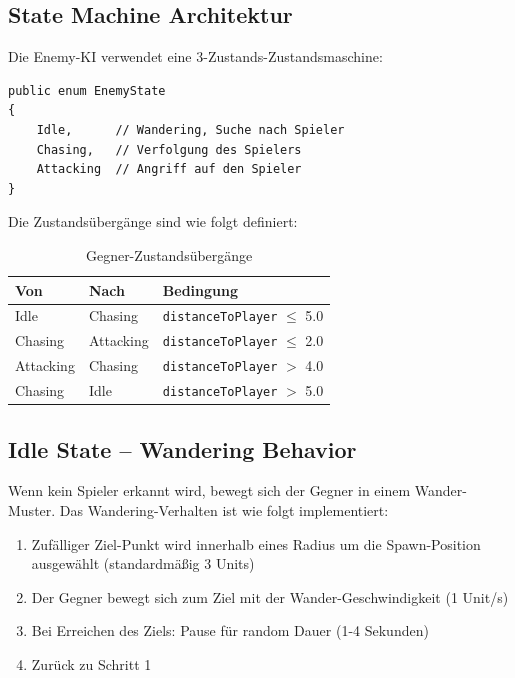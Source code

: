 \documentclass[
  a4paper,
  11pt,
  ngerman,
  parskip=half,
  bibliography=totoc,
  listof=totoc
]{scrreprt}
\begin{document}
\subsection{State Machine Architektur}

Die Enemy-KI verwendet eine 3-Zustands-Zustandsmaschine:

\begin{lstlisting}[caption={Enemy State Machine Enum}, label=lst:enemy_state]
public enum EnemyState
{
    Idle,      // Wandering, Suche nach Spieler
    Chasing,   // Verfolgung des Spielers
    Attacking  // Angriff auf den Spieler
}
\end{lstlisting}

Die Zustandsübergänge sind wie folgt definiert:

\begin{table}[h]
\centering
\caption{Gegner-Zustandsübergänge}
\label{tab:state_transitions}
\begin{tabular}{|l|l|l|}
\hline
\textbf{Von} & \textbf{Nach} & \textbf{Bedingung} \\
\hline
Idle & Chasing & \texttt{distanceToPlayer} $\leq$ 5.0 \\
Chasing & Attacking & \texttt{distanceToPlayer} $\leq$ 2.0 \\
Attacking & Chasing & \texttt{distanceToPlayer} $>$ 4.0 \\
Chasing & Idle & \texttt{distanceToPlayer} $>$ 5.0 \\
\hline
\end{tabular}
\end{table}

\subsection{Idle State -- Wandering Behavior}

Wenn kein Spieler erkannt wird, bewegt sich der Gegner in einem Wander-Muster. Das Wandering-Verhalten ist wie folgt implementiert:

\begin{enumerate}
    \item Zufälliger Ziel-Punkt wird innerhalb eines Radius um die Spawn-Position ausgewählt (standardmäßig 3 Units)
    \item Der Gegner bewegt sich zum Ziel mit der Wander-Geschwindigkeit (1 Unit/s)
    \item Bei Erreichen des Ziels: Pause für random Dauer (1-4 Sekunden)
    \item Zurück zu Schritt 1
\end{enumerate}
\end{document}
